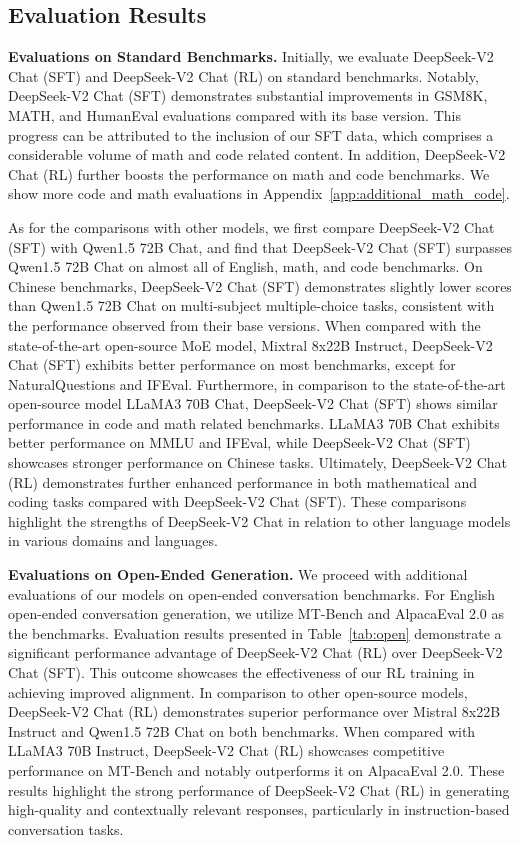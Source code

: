 \documentclass[11pt, a4paper, logo, copyright, nonumbering]{deepseek}
\newcommand{\dsvii}{DeepSeek-V2}
\newcommand{\dsviisft}{DeepSeek-V2 Chat (SFT)}
\newcommand{\dsviirl}{DeepSeek-V2 Chat (RL)}
\begin{document}
\begin{CJK*}{UTF8}{gbsn}
\subsection{Evaluation Results}

\textbf{Evaluations on Standard Benchmarks.}
Initially, we evaluate \dsviisft{} and \dsviirl{} on standard benchmarks. 
Notably, \dsviisft{} demonstrates substantial improvements in GSM8K, MATH, and HumanEval evaluations compared with its base version. 
This progress can be attributed to the inclusion of our SFT data, which comprises a considerable volume of math and code related content. 
In addition, \dsviirl{} further boosts the performance on math and code benchmarks. 
We show more code and math evaluations in Appendix~\ref{app:additional_math_code}. 

As for the comparisons with other models, we first compare \dsviisft{} with Qwen1.5 72B Chat, and find that \dsviisft{} surpasses Qwen1.5 72B Chat on almost all of English, math, and code benchmarks. 
On Chinese benchmarks, \dsviisft{} demonstrates slightly lower scores than Qwen1.5 72B Chat on multi-subject multiple-choice tasks, consistent with the performance observed from their base versions.
When compared with the state-of-the-art open-source MoE model, Mixtral 8x22B Instruct, \dsviisft{} exhibits better performance on most benchmarks, except for NaturalQuestions and IFEval. 
Furthermore, in comparison to the state-of-the-art open-source model LLaMA3 70B Chat, \dsviisft{} shows similar performance in code and math related benchmarks. 
LLaMA3 70B Chat exhibits better performance on MMLU and IFEval, while \dsviisft{} showcases stronger performance on Chinese tasks. 
Ultimately, \dsviirl{} demonstrates further enhanced performance in both mathematical and coding tasks compared with \dsviisft{}.
These comparisons highlight the strengths of \dsvii{} Chat in relation to other language models in various domains and languages.



\textbf{Evaluations on Open-Ended Generation.} 
We proceed with additional evaluations of our models on open-ended conversation benchmarks. 
For English open-ended conversation generation, we utilize MT-Bench and AlpacaEval 2.0 as the benchmarks. 
Evaluation results presented in Table~\ref{tab:open} demonstrate a significant performance advantage of \dsviirl{} over \dsviisft{}. 
This outcome showcases the effectiveness of our RL training in achieving improved alignment. 
In comparison to other open-source models, \dsviirl{} demonstrates superior performance over Mistral 8x22B Instruct and Qwen1.5 72B Chat on both benchmarks. 
When compared with LLaMA3 70B Instruct, \dsviirl{} showcases competitive performance on MT-Bench and notably outperforms it on AlpacaEval 2.0. 
These results highlight the strong performance of \dsviirl{} in generating high-quality and contextually relevant responses, particularly in instruction-based conversation tasks.


\end{CJK*}
\end{document}
